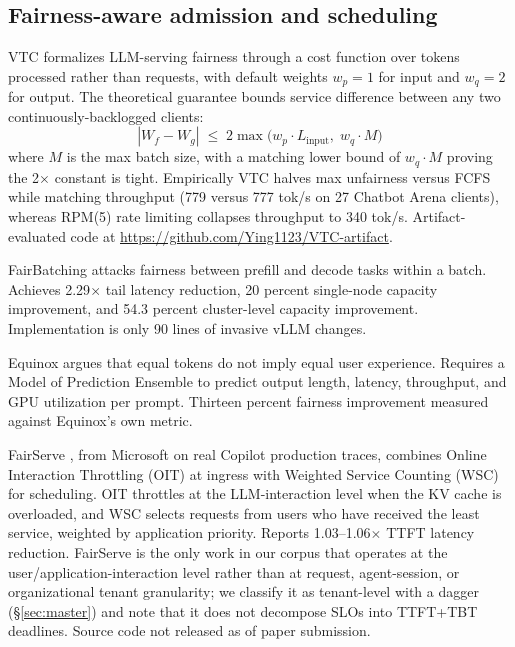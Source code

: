 \documentclass[11pt,letterpaper]{article}
\theoremstyle{definition}
\begin{document}
\subsection{Fairness-aware admission and scheduling}

VTC \cite{sheng2024vtc} formalizes LLM-serving fairness through a
cost function over tokens processed rather than requests, with default
weights $w_p = 1$ for input and $w_q = 2$ for output. The theoretical
guarantee bounds service difference between any two
continuously-backlogged clients:
%
\begin{equation}
|W_f - W_g| \;\le\; 2 \max\bigl(w_p \cdot L_{\text{input}},\; w_q \cdot M\bigr)
\label{eq:vtc-bound}
\end{equation}
%
where $M$ is the max batch size, with a matching lower bound of
$w_q \cdot M$ proving the 2$\times$ constant is tight. Empirically VTC
halves max unfairness versus FCFS while matching throughput (779
versus 777 tok/s on 27 Chatbot Arena clients), whereas RPM(5) rate
limiting collapses throughput to 340 tok/s. Artifact-evaluated code at
\url{https://github.com/Ying1123/VTC-artifact}.

FairBatching \cite{lyu2025fairbatching} attacks fairness between
prefill and decode tasks within a batch. Achieves 2.29$\times$ tail
latency reduction, 20 percent single-node capacity improvement, and
54.3 percent cluster-level capacity improvement. Implementation is
only 90 lines of invasive vLLM changes.

Equinox \cite{lu2025equinox} argues that equal tokens do not imply
equal user experience. Requires a Model of Prediction Ensemble to
predict output length, latency, throughput, and GPU utilization per
prompt. Thirteen percent fairness improvement measured against
Equinox's own metric.

FairServe \cite{khan2024fairserve}, from Microsoft on real Copilot
production traces, combines Online Interaction Throttling (OIT) at
ingress with Weighted Service Counting (WSC) for scheduling. OIT
throttles at the LLM-interaction level when the KV cache is
overloaded, and WSC selects requests from users who have received
the least service, weighted by application priority. Reports
1.03--1.06$\times$ TTFT latency reduction. FairServe is the only
work in our corpus that operates at the user/application-interaction
level rather than at request, agent-session, or organizational
tenant granularity; we classify it as tenant-level with a dagger
(\S\ref{sec:master}) and note that it does not decompose SLOs into
TTFT+TBT deadlines. Source code not released as of paper
submission.
\end{document}
